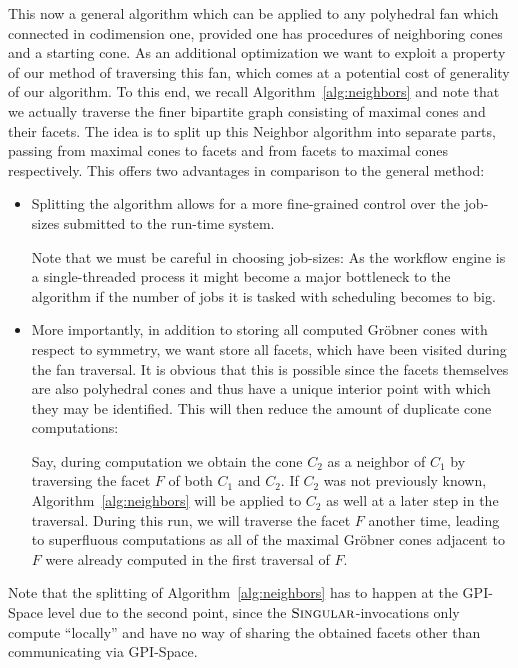 \documentclass[
  paper=a4,
  titlepage,
  bibliography=totoc,
  pagesize=pdftex
]{scrartcl}
\numberwithin{figure}{section}
\numberwithin{equation}{section}
\numberwithin{table}{section}
\theoremstyle{definition}
\numberwithin{definition}{section}
\begin{document}
This now a general algorithm which can be applied to any polyhedral fan which connected in
codimension one, provided one has procedures of neighboring cones and a starting cone. As
an additional optimization we want to exploit a property of our method of traversing this
fan, which comes at a potential cost of generality of our algorithm. To this end, we
recall Algorithm~\ref{alg:neighbors} and note that we actually traverse the finer
bipartite graph consisting of maximal cones and their facets. The idea is to split up this
Neighbor algorithm into separate parts, passing from maximal cones to facets and from
facets to maximal cones respectively. This offers two advantages in comparison to the
general method:
\begin{itemize}
  \item Splitting the algorithm allows for a more fine-grained control over the job-sizes
    submitted to the run-time system.

    Note that we must be careful in choosing job-sizes: As the workflow engine is a
    single-threaded process it might become a major bottleneck to the algorithm if the
    number of jobs it is tasked with scheduling becomes to big.
  \item More importantly, in addition to storing all computed Gröbner cones with respect
    to symmetry, we want store all facets, which have been visited during the fan
    traversal. It is obvious that this is possible since the facets themselves are also
    polyhedral cones and thus have a unique interior point with which they may be
    identified. This will then reduce the amount of duplicate cone computations:

    Say, during computation we obtain the cone $C_2$ as a neighbor of $C_1$ by traversing
    the facet $F$ of both $C_1$ and $C_2$. If $C_2$ was not previously known,
    Algorithm~\ref{alg:neighbors} will be applied to $C_2$ as well at a later step in the
    traversal. During this run, we will traverse the facet $F$ another time, leading to
    superfluous computations as all of the maximal Gröbner cones adjacent to $F$ were
    already computed in the first traversal of $F$.
\end{itemize}
Note that the splitting of Algorithm~\ref{alg:neighbors} has to happen at the GPI-Space
level due to the second point, since the $\textsc{Singular}$-invocations only compute
\enquote{locally} and have no way of sharing the obtained facets other than communicating
via GPI-Space.
\end{document}
